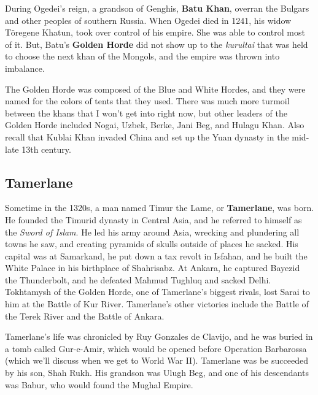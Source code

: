 During Ogedei's reign, a grandson of Genghis, \textbf{Batu Khan},
overran the Bulgars and other peoples of southern Russia.
When Ogedei died in 1241, his widow T\"oregene Khatun, took over control of his empire.
She was able to control most of it.
But, Batu's \textbf{Golden Horde} did not show up to the
\textit{kurultai} that was held to choose the next khan of the Mongols,
and the empire was thrown into imbalance.

The Golden Horde was composed of the Blue and White Hordes,
and they were named for the colors of tents that they used.
There was much more turmoil between the khans that I won't get into right now,
but other leaders of the Golden Horde included Nogai, Uzbek, Berke, Jani Beg, and Hulagu Khan.
Also recall that Kublai Khan invaded China and set up the Yuan dynasty in the mid-late 13th century.

\subsection*{Tamerlane}

Sometime in the 1320s, a man named Timur the Lame, or \textbf{Tamerlane}, was born.
He founded the Timurid dynasty in Central Asia, and he referred to himself as the \textit{Sword of Islam}.
He led his army around Asia, wrecking and plundering all towns he saw,
and creating pyramids of skulls outside of places he sacked.
His capital was at Samarkand, he put down a tax revolt in Isfahan,
and he built the White Palace in his birthplace of Shahrisabz.
At Ankara, he captured Bayezid the Thunderbolt,
and he defeated Mahmud Tughluq and sacked Delhi.
Tokhtamysh of the Golden Horde, one of Tamerlane's biggest rivals, lost Sarai to him at the Battle of Kur River.
Tamerlane's other victories include the Battle of the Terek River and the Battle of Ankara.

Tamerlane's life was chronicled by Ruy Gonzales de Clavijo, and he was buried in a tomb called Gur-e-Amir,
which would be opened before Operation Barbarossa (which we'll discuss when we get to World War II).
Tamerlane was be succeeded by his son, Shah Rukh.
His grandson was Ulugh Beg, and one of his descendants was Babur, who would found the Mughal Empire.
